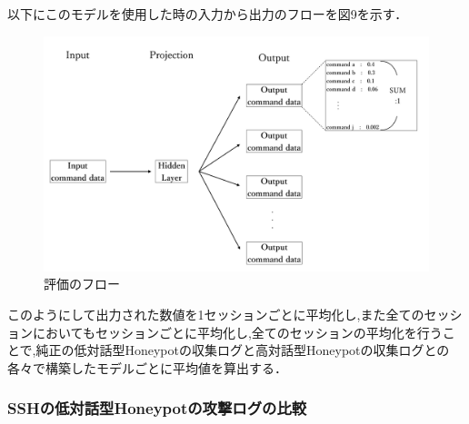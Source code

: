 以下にこのモデルを使用した時の入力から出力のフローを図9を示す．

\begin{figure}[H]
    \centering
    \includegraphics[width=1.0\textwidth]{figures/evalflow.png}
    \caption{評価のフロー\cite{word2vecpaper}\cite{word2vecpaper2}}
    \label{fig:evo}
\end{figure}

このようにして出力された数値を1セッションごとに平均化し,また全てのセッションにおいてもセッションごとに平均化し,全てのセッションの平均化を行うことで,純正の低対話型Honeypotの収集ログと高対話型Honeypotの収集ログとの各々で構築したモデルごとに平均値を算出する．


\label{evaluation:CommandVector}

\subsubsection{SSHの低対話型Honeypotの攻撃ログの比較}
\label{evaluation:CompareLog}



